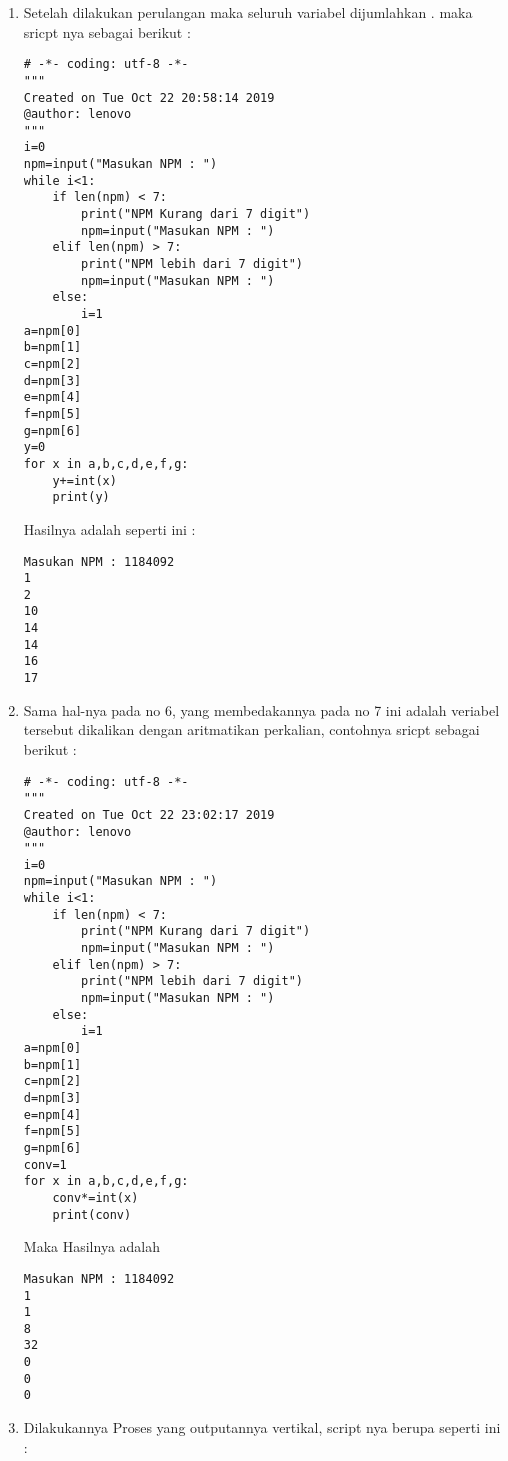 \begin{enumerate}
\begin{verbatim}
"""
Created on Tue Oct 22 22:47:07 2019
@author: lenovo
"""
i=0
npm=input("Masukan NPM : ")
while i<1:
    if len(npm) < 7:
        print("NPM Kurang dari 7 digit")
        npm=input("Masukan NPM : ")
    elif len(npm) > 7:
        print("NPM lebih dari 7 digit")
        npm=input("Masukan NPM : ")
    else:
        i=1
a=npm[0]
b=npm[1]
c=npm[2]
d=npm[3]
e=npm[4]
f=npm[5]
g=npm[6]
for x in a,b,c,d,e,f,g:
    print(x,end = ""),
\end{verbatim}
Maka akan keluar outputan : \\
Masukan NPM : 1184092 \\
1184092
\item
Setelah dilakukan perulangan maka seluruh variabel dijumlahkan . maka sricpt nya sebagai berikut :
\begin{verbatim}
# -*- coding: utf-8 -*-
"""
Created on Tue Oct 22 20:58:14 2019
@author: lenovo
"""
i=0
npm=input("Masukan NPM : ")
while i<1:
    if len(npm) < 7:
        print("NPM Kurang dari 7 digit")
        npm=input("Masukan NPM : ")
    elif len(npm) > 7:
        print("NPM lebih dari 7 digit")
        npm=input("Masukan NPM : ")
    else:
        i=1
a=npm[0]
b=npm[1]
c=npm[2]
d=npm[3]
e=npm[4]
f=npm[5]
g=npm[6]
y=0
for x in a,b,c,d,e,f,g:
    y+=int(x)
    print(y)
\end{verbatim}
Hasilnya adalah seperti ini :
\begin{verbatim}
Masukan NPM : 1184092
1
2
10
14
14
16
17
\end{verbatim}
\item 
Sama hal-nya pada no 6, yang membedakannya pada no 7 ini adalah veriabel tersebut dikalikan dengan aritmatikan perkalian, contohnya sricpt sebagai berikut : 
\begin{verbatim}
# -*- coding: utf-8 -*-
"""
Created on Tue Oct 22 23:02:17 2019
@author: lenovo
"""
i=0
npm=input("Masukan NPM : ")
while i<1:
    if len(npm) < 7:
        print("NPM Kurang dari 7 digit")
        npm=input("Masukan NPM : ")
    elif len(npm) > 7:
        print("NPM lebih dari 7 digit")
        npm=input("Masukan NPM : ")
    else:
        i=1
a=npm[0]
b=npm[1]
c=npm[2]
d=npm[3]
e=npm[4]
f=npm[5]
g=npm[6]
conv=1
for x in a,b,c,d,e,f,g:
    conv*=int(x)
    print(conv)
\end{verbatim}
Maka Hasilnya adalah
\begin{verbatim}
Masukan NPM : 1184092
1
1
8
32
0
0
0
\end{verbatim}
\item
Dilakukannya Proses yang outputannya vertikal, script nya berupa seperti ini :

\end{enumerate}
